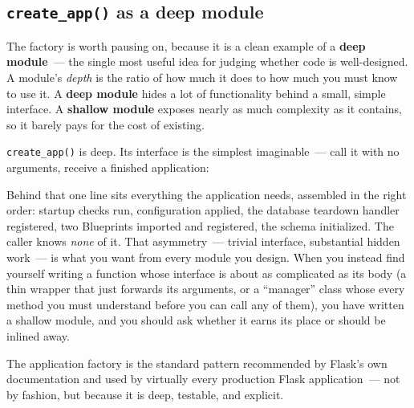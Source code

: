 \subsection*{\texorpdfstring{\texttt{create\_app()} as a deep module}{create\_app() as a deep module}}\label{15-structuring-the-application:create-app-as-a-deep-module}

The factory is worth pausing on, because it is a clean example of a \textbf{deep module}~--- the single most useful idea for judging whether code is well-designed. A module's \emph{depth} is the ratio of how much it does to how much you must know to use it. A \textbf{deep module} hides a lot of functionality behind a small, simple interface. A \textbf{shallow module} exposes nearly as much complexity as it contains, so it barely pays for the cost of existing.

\texttt{create\_app()} is deep. Its interface is the simplest imaginable~--- call it with no arguments, receive a finished application:

\begin{codebox}[short]

\begin{Shaded}
\begin{Highlighting}[]
\OperatorTok{=}
\end{Highlighting}
\end{Shaded}

\end{codebox}

\noindent{}Behind that one line sits everything the application needs, assembled in the right order: startup checks run, configuration applied, the database teardown handler registered, two Blueprints imported and registered, the schema initialized. The caller knows \emph{none} of it. That asymmetry~--- trivial interface, substantial hidden work~--- is what you want from every module you design. When you instead find yourself writing a function whose interface is about as complicated as its body (a thin wrapper that just forwards its arguments, or a ``manager'' class whose every method you must understand before you can call any of them), you have written a shallow module, and you should ask whether it earns its place or should be inlined away.

The application factory is the standard pattern recommended by Flask's own documentation and used by virtually every production Flask application~--- not by fashion, but because it is deep, testable, and explicit.

